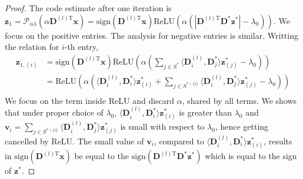 \documentclass[10pt]{article} %
\newcommand{\D}{{\bm D}}
\newcommand{\x}{{\bm x}}
\newcommand{\z}{{\bm z}}
\newcommand{\vvec}{{\bm v}}
\newcommand{\prox}{\mathcal{P}}
\begin{document}
\begin{proof} 
The code estimate after one iteration is $\z_{1} = \prox_{\alpha \lambda}(\alpha \D^{(l)\text{T}} \x) = \text{sign}(\D^{(l)\text{T}} \x) \text{ReLU}(\alpha (| \D^{(l)\text{T}} \D^{\ast} \z^{\ast}| - \lambda_0))$. We focus on the positive entries. The analysis for negative entries is similar. Writting the relation for $i$-th entry,
\begin{equation}
\begin{aligned}
\z_{1,(i)} &=  \text{sign}(\D^{(l)\text{T}} \x) \text{ReLU}(\alpha (\sum_{j \in S^{\ast}} \langle \D^{(l)}_i, \D^{\ast}_j \rangle \z^{\ast}_{(j)} - \lambda_0))\\
&= \text{ReLU}(\alpha (\langle \D^{(l)}_i, \D^{\ast}_i \rangle  \z^{\ast}_{(i)} + \sum_{j \in S^{\ast \backslash \{i\}}} \langle \D^{(l)}_i,  \D^{\ast}_j \rangle  \z^{\ast}_{(j)}  - \lambda_0))\\
\end{aligned}
\end{equation}
We focus on the term inside ReLU and discard $\alpha$, shared by all terms. We shows that under proper choice of $\lambda_0$, $\langle \D^{(l)}_i, \D^{\ast}_i \rangle  \z^{\ast}_{(i)}$ is greater than $\lambda_0$ and $\vvec_i = \sum_{j \in S^{\ast \backslash \{i\}}} \langle \D^{(l)}_i, \D^{\ast}_j \rangle  \z^{\ast}_{(j)}$ is small with respect to $\lambda_0$, hence getting cancelled by ReLU. The small value of $\vvec_i$, compared to $\langle \D^{(l)}_i, \D^{\ast}_i \rangle  \z^{\ast}_{(i)}$, results in $\text{sign}(\D^{(l)\text{T}} \x)$ be equal to the $\text{sign}(\D^{(l)\text{T}} \D^{\ast} \z^{\ast})$ which is equal to the sign of $\z^{\ast}$.


\end{proof}
\end{document}
